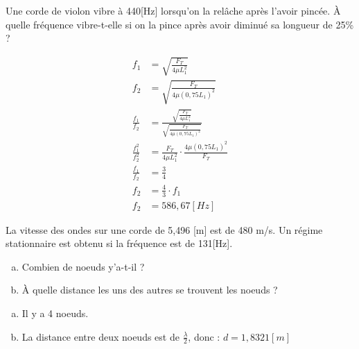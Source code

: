 \begin{exercise}
    Une corde de violon vibre à 440[Hz] lorsqu'on la relâche après l'avoir pincée. À quelle fréquence vibre-t-elle si on la pince après avoir diminué sa longueur de 25\% ?
\end{exercise}
\newpage
\begin{solution}
    \begin{equation*}
        \begin{aligned}
            f_1                   & =\sqrt{\frac{F_T}{4 \mu L_1 ^2}}                                               \\
            f_2                   & =\sqrt{\frac{F_T}{4 \mu (0,75 L_1)^2}}                                         \\
            \frac{f_1}{f_2}       & =\frac{\sqrt{\frac{F_T}{4 \mu L_1 ^2}}}{\sqrt{\frac{F_T}{4 \mu (0,75 L_1)^2}}} \\
            \frac{f_1 ^2}{f_2 ^2} & =\frac{F_T}{4 \mu L_1 ^2}  \cdot \frac{4 \mu (0,75 L_1)^2}{F_T}                \\
            \frac{f_1}{f_2}       & =\frac{3}{4}                                                                   \\
            f_2                   & =\frac{4}{3} \cdot f_1                                                         \\
            f_2                   & =586,67[Hz]
        \end{aligned}
    \end{equation*}

\end{solution}

\begin{exercise}
    La vitesse des ondes sur une corde de 5,496 [m] est de 480 m/s. Un régime stationnaire est obtenu si la fréquence est de 131[Hz].
    \begin{enumerate}[a)]
        \item Combien de noeuds y'a-t-il ?
        \item À quelle distance les uns des autres se trouvent les noeuds ?
    \end{enumerate}
\end{exercise}
\begin{solution}
    \begin{enumerate}[a)]
        \item Il y a 4 noeuds.
        \item La distance entre deux noeuds est de \(\frac{\lambda}{2}\), donc : \(d=1,8321[m]\)
    \end{enumerate}
\end{solution}

